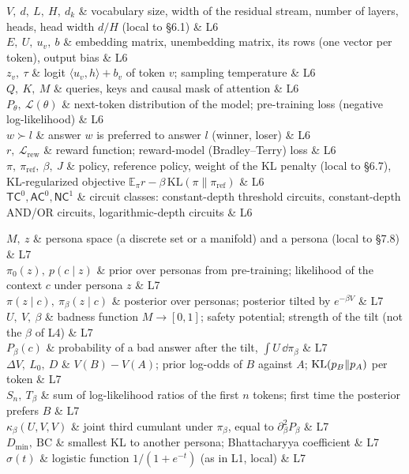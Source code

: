 \begin{notationchunk}
$V,\ d,\ L,\ H,\ d_k$ & vocabulary size, width of the residual stream, number of layers, heads, head width $d/H$ (local to \S6.1) & L6\\
$E,\ U,\ u_v,\ b$ & embedding matrix, unembedding matrix, its rows (one vector per token), output bias & L6\\
$z_v,\ \tau$ & logit $\langle u_v,h\rangle+b_v$ of token $v$; sampling temperature & L6\\
$Q,\ K,\ M$ & queries, keys and causal mask of attention & L6\\
$P_\theta,\ \mathcal L(\theta)$ & next-token distribution of the model; pre-training loss (negative log-likelihood) & L6\\
$w\succ l$ & answer $w$ is preferred to answer $l$ (winner, loser) & L6\\
$r,\ \mathcal L_{\mathrm{rew}}$ & reward function; reward-model (Bradley--Terry) loss & L6\\
$\pi,\ \pi_{\mathrm{ref}},\ \beta,\ J$ & policy, reference policy, weight of the KL penalty (local to \S6.7), KL-regularized objective $\mathbb E_\pi r-\beta\,\mathrm{KL}(\pi\|\pi_{\mathrm{ref}})$ & L6\\
$\mathsf{TC}^0,\mathsf{AC}^0,\mathsf{NC}^1$ & circuit classes: constant-depth threshold circuits, constant-depth AND/OR circuits, logarithmic-depth circuits & L6\\
\end{notationchunk}
\begin{notationchunk}
$M,\ z$ & persona space (a discrete set or a manifold) and a persona (local to \S7.8) & L7\\
$\pi_0(z),\ p(c\mid z)$ & prior over personas from pre-training; likelihood of the context $c$ under persona $z$ & L7\\
$\pi(z\mid c),\ \pi_\beta(z\mid c)$ & posterior over personas; posterior tilted by $e^{-\beta V}$ & L7\\
$U,\ V,\ \beta$ & badness function $M\to[0,1]$; safety potential; strength of the tilt (not the $\beta$ of L4) & L7\\
$P_\beta(c)$ & probability of a bad answer after the tilt, $\int U\,\dd\pi_\beta$ & L7\\
$\Delta V,\ L_0,\ D$ & $V(B)-V(A)$; prior log-odds of $B$ against $A$; $\operatorname{KL}(p_B\|p_A)$ per token & L7\\
$S_n,\ T_\beta$ & sum of log-likelihood ratios of the first $n$ tokens; first time the posterior prefers $B$ & L7\\
$\kappa_\beta(U,V,V)$ & joint third cumulant under $\pi_\beta$, equal to $\partial_\beta^2P_\beta$ & L7\\
$D_{\min},\ \mathrm{BC}$ & smallest KL to another persona; Bhattacharyya coefficient & L7\\
$\sigma(t)$ & logistic function $1/(1+e^{-t})$ (as in L1, local) & L7\\
\end{notationchunk}
